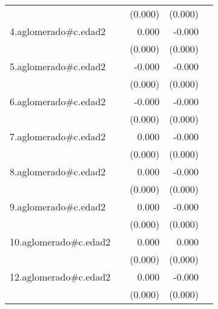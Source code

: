 {\begin{longtable}{l*{4}{D{.}{.}{-1}}}
            &                     &     (0.000)         &     (0.000)         &                     \\
\addlinespace
4.aglomerado#c.edad2&                     &       0.000         &      -0.000\sym{***}&                     \\
            &                     &     (0.000)         &     (0.000)         &                     \\
\addlinespace
5.aglomerado#c.edad2&                     &      -0.000         &      -0.000\sym{***}&                     \\
            &                     &     (0.000)         &     (0.000)         &                     \\
\addlinespace
6.aglomerado#c.edad2&                     &      -0.000         &      -0.000\sym{***}&                     \\
            &                     &     (0.000)         &     (0.000)         &                     \\
\addlinespace
7.aglomerado#c.edad2&                     &       0.000         &      -0.000         &                     \\
            &                     &     (0.000)         &     (0.000)         &                     \\
\addlinespace
8.aglomerado#c.edad2&                     &       0.000         &      -0.000         &                     \\
            &                     &     (0.000)         &     (0.000)         &                     \\
\addlinespace
9.aglomerado#c.edad2&                     &       0.000         &      -0.000\sym{*}  &                     \\
            &                     &     (0.000)         &     (0.000)         &                     \\
\addlinespace
10.aglomerado#c.edad2&                     &       0.000\sym{*}  &       0.000         &                     \\
            &                     &     (0.000)         &     (0.000)         &                     \\
\addlinespace
12.aglomerado#c.edad2&                     &       0.000         &      -0.000         &                     \\
            &                     &     (0.000)         &     (0.000)         &                     \\

\end{longtable}}
